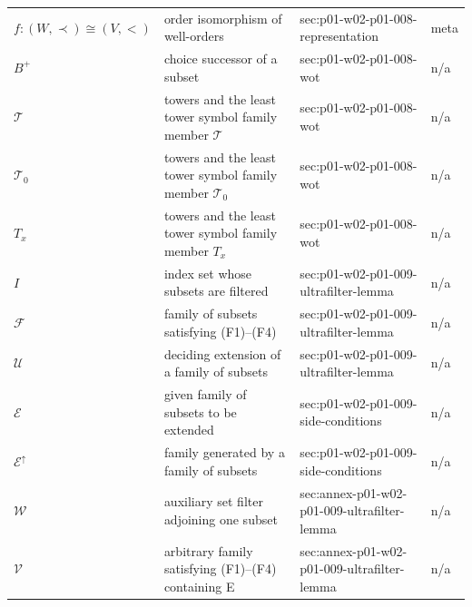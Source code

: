 \begin{longtable}{@{}p{}p{}p{}p{}@{}}
\(f:(W,\allowbreak \prec)\cong(V,\allowbreak <)\) & order isomorphism of well-orders & sec:\allowbreak{}p01-\allowbreak{}w02-\allowbreak{}p01-\allowbreak{}008-\allowbreak{}representation & meta \\
\(B^{+}\) & choice successor of a subset & sec:\allowbreak{}p01-\allowbreak{}w02-\allowbreak{}p01-\allowbreak{}008-\allowbreak{}wot & n/a \\
\(\mathcal T\) & towers and the least tower symbol family member \(\mathcal T\) & sec:\allowbreak{}p01-\allowbreak{}w02-\allowbreak{}p01-\allowbreak{}008-\allowbreak{}wot & n/a \\
\(\mathcal T_0\) & towers and the least tower symbol family member \(\mathcal T_0\) & sec:\allowbreak{}p01-\allowbreak{}w02-\allowbreak{}p01-\allowbreak{}008-\allowbreak{}wot & n/a \\
\(T_x\) & towers and the least tower symbol family member \(T_x\) & sec:\allowbreak{}p01-\allowbreak{}w02-\allowbreak{}p01-\allowbreak{}008-\allowbreak{}wot & n/a \\
\(I\) & index set whose subsets are filtered & sec:\allowbreak{}p01-\allowbreak{}w02-\allowbreak{}p01-\allowbreak{}009-\allowbreak{}ultrafilter-\allowbreak{}lemma & n/a \\
\(\mathcal F\) & family of subsets satisfying (F1)--(F4) & sec:\allowbreak{}p01-\allowbreak{}w02-\allowbreak{}p01-\allowbreak{}009-\allowbreak{}ultrafilter-\allowbreak{}lemma & n/a \\
\(\mathcal U\) & deciding extension of a family of subsets & sec:\allowbreak{}p01-\allowbreak{}w02-\allowbreak{}p01-\allowbreak{}009-\allowbreak{}ultrafilter-\allowbreak{}lemma & n/a \\
\(\mathcal E\) & given family of subsets to be extended & sec:\allowbreak{}p01-\allowbreak{}w02-\allowbreak{}p01-\allowbreak{}009-\allowbreak{}side-\allowbreak{}conditions & n/a \\
\(\mathcal E^{\uparrow}\) & family generated by a family of subsets & sec:\allowbreak{}p01-\allowbreak{}w02-\allowbreak{}p01-\allowbreak{}009-\allowbreak{}side-\allowbreak{}conditions & n/a \\
\(\mathcal W\) & auxiliary set filter adjoining one subset & sec:\allowbreak{}annex-\allowbreak{}p01-\allowbreak{}w02-\allowbreak{}p01-\allowbreak{}009-\allowbreak{}ultrafilter-\allowbreak{}lemma & n/a \\
\(\mathcal V\) & arbitrary family satisfying (F1)--(F4) containing E & sec:\allowbreak{}annex-\allowbreak{}p01-\allowbreak{}w02-\allowbreak{}p01-\allowbreak{}009-\allowbreak{}ultrafilter-\allowbreak{}lemma & n/a \\

\end{longtable}
